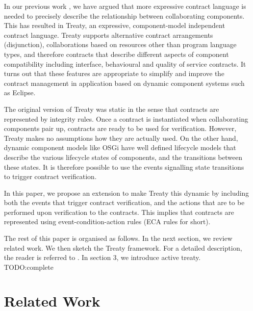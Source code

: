 \documentclass{llncs}
\begin{document}
In our previous work \cite{Treaty.JOT2009}, we have argued that more expressive contract language is needed to precisely describe the relationship between collaborating components. This has resulted in Treaty, an expressive, component-model independent contract language. Treaty supports alternative contract arrangements (disjunction), collaborations based on resources other than program language types, and therefore contracts that describe different aspects of component compatibility \cite{BeugnardEtAl99} including interface, behavioural and quality of service contracts. It turns out that these features are appropriate to simplify and improve the contract management in application based on dynamic component systems such as Eclipse. 

The original version of Treaty was static in the sense that contracts are represented by integrity rules. Once a contract is instantiated when collaborating components pair up, contracts are ready to be used for verification. However, Treaty makes no assumptions how they are actually used. On the other hand, dynamic component models like OSGi have well defined lifecycle models that describe the various lifecycle states of components, and the transitions between these states. It is therefore possible to use the events signalling state transitions to trigger contract verification. 

In this paper, we propose an extension to make Treaty this dynamic by including both the events that trigger contract verification, and the actions that are to be performed upon verification  to the contracts. This implies that contracts are represented using event-condition-action rules (ECA rules for short). 

The rest of this paper is organised as follows. In the next section, we review related work. We then sketch the Treaty framework. For a detailed description, the reader is referred to \cite{Treaty.JOT2009}. In section 3, we introduce active treaty. TODO:complete 

\section{Related Work}

\end{document}
